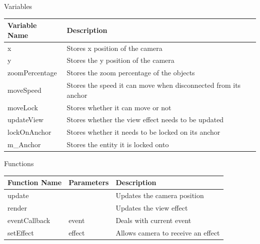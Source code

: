 \documentclass{article}
\begin{document}
                \begin{center}
                    Variables
                    \begin{tabular}{ | m{} | m{} | }
                        \hline
                        \textbf{Variable Name} & \textbf{Description} \\
                        \hline
                        x & Stores x position of the camera \\
                        \hline
                        y & Stores the y position of the camera \\
                        \hline
                        zoomPercentage & Stores the zoom percentage of the objects \\
                        \hline
                        moveSpeed & Stores the speed it can move when disconnected from its anchor \\
                        \hline
                        moveLock & Stores whether it can move or not \\
                        \hline
                        updateView & Stores whether the view effect needs to be updated \\
                        \hline
                        lockOnAnchor & Stores whether it needs to be locked on its anchor \\
                        \hline
                        m\_Anchor & Stores the entity it is locked onto \\
                        \hline
                    \end{tabular}
                    Functions
                    \begin{tabular}{ | m{} | m{}| m{} | }
                        \hline
                        \textbf{Function Name} & \textbf{Parameters} & \textbf{Description} \\
                        \hline
                        update & & Updates the camera position \\
                        \hline
                        render & & Updates the view effect \\
                        \hline
                        eventCallback & event & Deals with current event \\
                        \hline
                        setEffect & effect & Allows camera to receive an effect \\
                        \hline

\end{tabular}
\end{center}
\end{document}
